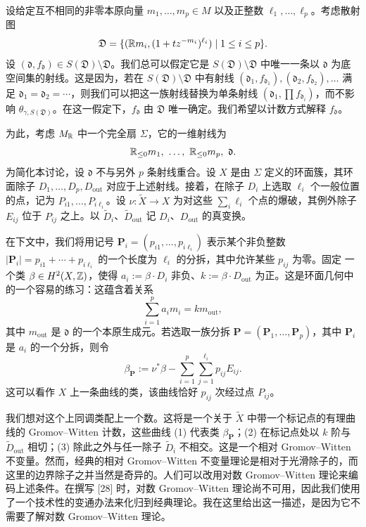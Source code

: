 设给定互不相同的非零本原向量 $m_1,\dots,m_p\in M$ 以及正整数 $\ell_1,\dots,\ell_p$。考虑散射图
\[
\mathfrak{D}=\{(\mathbb{R} m_i,(1+tz^{-m_i})^{\ell_i})\mid 1\le i\le p\}.
\]
设 $(\mathfrak{d},f_\mathfrak{d})\in S(\mathfrak{D})\setminus\mathfrak{D}$。我们总可以假定它是 $S(\mathfrak{D})\setminus\mathfrak{D}$ 中唯一一条以 $\mathfrak{d}$ 为底空间集的射线。这是因为，若在 $S(\mathfrak{D})\setminus\mathfrak{D}$ 中有射线 $(\mathfrak{d}_1,f_{\mathfrak{d}_1}),(\mathfrak{d}_2,f_{\mathfrak{d}_2}),\dots$ 满足 $\mathfrak{d}_1=\mathfrak{d}_2=\cdots$，则我们可以把这一族射线替换为单条射线 $(\mathfrak{d}_1,\prod f_{\mathfrak{d}_i})$，而不影响 $\theta_{\gamma,S(\mathfrak{D})}$。在这一假定下，$f_\mathfrak{d}$ 由 $\mathfrak{D}$ 唯一确定。我们希望以计数方式解释 $f_\mathfrak{d}$。

为此，考虑 $M_{\mathbb{R}}$ 中一个完全扇 $\Sigma$，它的一维射线为
\[
\R_{\le0}m_1,\ \dots,\ \R_{\le0}m_p,\ \mathfrak{d}.
\]
为简化本讨论，设 $\mathfrak{d}$ 不与另外 $p$ 条射线重合。设 $X$ 是由 $\Sigma$ 定义的环面簇，其环面除子 $D_1,\dots,D_p,D_{\mathrm{out}}$ 对应于上述射线。接着，在除子 $D_i$ 上选取 $\ell_i$ 个一般位置的点，记为 $P_{i1},\dots,P_{i\ell_i}$。设 $\nu:\tilde X\to X$ 为对这些 $\sum_i\ell_i$ 个点的爆破，其例外除子 $E_{ij}$ 位于 $P_{ij}$ 之上。以 $\tilde D_i$、$\tilde D_{\mathrm{out}}$ 记 $D_i$、$D_{\mathrm{out}}$ 的真变换。

在下文中，我们将用记号 $\mathbf{P}_i=(p_{i1},\dots,p_{i\ell_i})$ 表示某个非负整数 $|\mathbf{P}_i|=p_{i1}+\cdots+p_{i\ell_i}$ 的一个长度为 $\ell_i$ 的分拆，其中允许某些 $p_{ij}$ 为零。固定
一个类 $\beta\in H^2(X,\mathbb{Z})$，使得 $a_i:=\beta\cdot D_i$ 非负、$k:=\beta\cdot D_{\mathrm{out}}$ 为正。这是环面几何中的一个容易的练习：这蕴含着关系
\[
\sum_{i=1}^{p}a_im_i=km_{\mathrm{out}},
\]
其中 $m_{\mathrm{out}}$ 是 $\mathfrak{d}$ 的一个本原生成元。若选取一族分拆 $\mathbf{P}=(\mathbf{P}_1,\dots,\mathbf{P}_p)$，其中 $\mathbf{P}_i$ 是 $a_i$ 的一个分拆，则令
\[
\beta_{\mathbf{P}}:=\nu^*\beta-\sum_{i=1}^{p}\sum_{j=1}^{\ell_i}p_{ij}E_{ij}.
\]
这可以看作 $X$ 上一条曲线的类，该曲线恰好 $p_{ij}$ 次经过点 $P_{ij}$。

我们想对这个上同调类配上一个数。这将是一个关于 $\tilde X$ 中带一个标记点的有理曲线的 Gromov--Witten 计数，这些曲线 (1) 代表类 $\beta_{\mathbf{P}}$；(2) 在标记点处以 $k$ 阶与 $\tilde D_{\mathrm{out}}$ 相切；(3) 除此之外与任一除子 $\tilde D_i$ 不相交。这是一个相对 Gromov--Witten 不变量。然而，经典的相对 Gromov--Witten 不变量理论是相对于光滑除子的，而这里的边界除子之并当然是奇异的。人们可以改用对数 Gromov--Witten 理论来编码上述条件。在撰写 [28] 时，对数 Gromov--Witten 理论尚不可用，因此我们使用了一个技术性的变通办法来化归到经典理论。我在这里给出这一描述，是因为它不需要了解对数 Gromov--Witten 理论。

